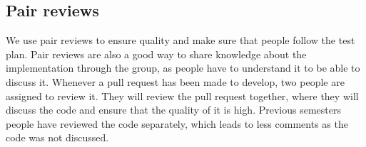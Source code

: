\subsection{Pair reviews}
We use pair reviews to ensure quality and make sure that people follow the test plan.
Pair reviews are also a good way to share knowledge about the implementation through the group, as people have to understand it to be able to discuss it.
Whenever a pull request has been made to develop, two people are assigned to review it.
They will review the pull request together, where they will discuss the code and ensure that the quality of it is high.
Previous semesters people have reviewed the code separately, which leads to less comments as the code was not discussed.
